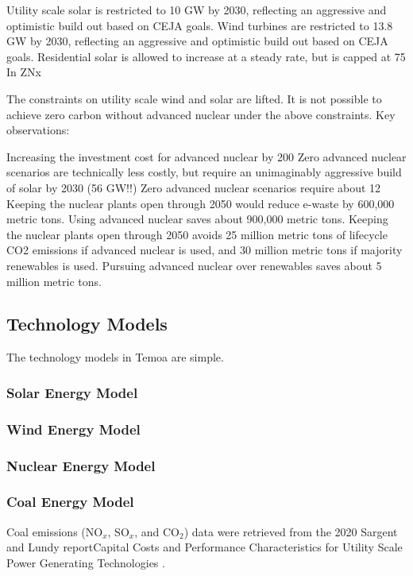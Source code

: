 Utility scale solar is restricted to 10 GW by 2030, reflecting an aggressive and optimistic build out based on CEJA goals.
Wind turbines are restricted to 13.8 GW by 2030, reflecting an aggressive and optimistic build out based on CEJA goals.
Residential solar is allowed to increase at a steady rate, but is capped at 75%
In ZNx

The constraints on utility scale wind and solar are lifted. It is not possible to achieve zero carbon without advanced nuclear under the above constraints.
Key observations:

Increasing the investment cost for advanced nuclear by 200%
Zero advanced nuclear scenarios are technically less costly, but require an unimaginably aggressive build of solar by 2030 (56 GW!!)
Zero advanced nuclear scenarios require about 12%
Keeping the nuclear plants open through 2050 would reduce e-waste by 600,000 metric tons. Using advanced nuclear saves about 900,000 metric tons.
Keeping the nuclear plants open through 2050 avoids 25 million metric tons of lifecycle CO2 emissions if advanced nuclear is used, and 30 million metric tons if majority renewables is used. Pursuing advanced nuclear over renewables saves about 5 million metric tons.
\subsection{Technology Models}
The technology models in Temoa are simple. 
\subsubsection{Solar Energy Model}
\subsubsection{Wind Energy Model}
\subsubsection{Nuclear Energy Model}
\subsubsection{Coal Energy Model}
Coal emissions (NO$_x$, SO$_x$, and CO$_2$) data were retrieved from the 2020 Sargent and Lundy reportCapital Costs and Performance Characteristics for Utility Scale Power Generating Technologies \cite{sargent__lundy_capital_2020}.
